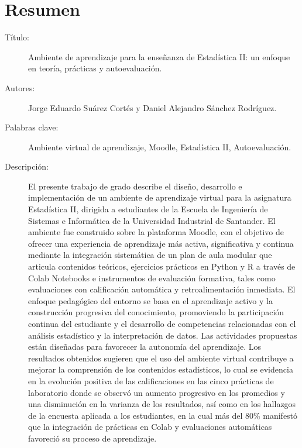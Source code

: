 \documentclass[letter,oneside,12pt,spanish]{report}
\begin{document}
\newpage

\newpage

\chapter*{Resumen}

\footnotesize{
\begin{description}
  \item[Título:] Ambiente de aprendizaje para la enseñanza de Estadística II: un enfoque en teoría, prácticas y autoevaluación.
  \item[Autores:] Jorge Eduardo Suárez Cortés y Daniel Alejandro Sánchez Rodríguez.
  \item[Palabras clave:] Ambiente virtual de aprendizaje, Moodle, Estadística II, Autoevaluación.
  \item[Descripción:] {
    \begin{spacing}{1.7}
    El presente trabajo de grado describe el diseño, desarrollo e implementación de un ambiente de aprendizaje virtual para la asignatura Estadística II, dirigida a estudiantes de la Escuela de Ingeniería de Sistemas e Informática de la Universidad Industrial de Santander. El ambiente fue construido sobre la plataforma Moodle, con el objetivo de ofrecer una experiencia de aprendizaje más activa, significativa y continua mediante la integración sistemática de un plan de aula modular que articula contenidos teóricos, ejercicios prácticos en Python y R a través de Colab Notebooks e instrumentos de evaluación formativa, tales como evaluaciones con calificación automática y retroalimentación inmediata.  
    El enfoque pedagógico del entorno se basa en el aprendizaje activo y la construcción progresiva del conocimiento, promoviendo la participación continua del estudiante y el desarrollo de competencias relacionadas con el análisis estadístico y la interpretación de datos. Las actividades propuestas están diseñadas para favorecer la autonomía del aprendizaje. Los resultados obtenidos sugieren que el uso del ambiente virtual contribuye a mejorar la comprensión de los contenidos estadísticos, lo cual se evidencia en la evolución positiva de las calificaciones en las cinco prácticas de laboratorio donde se observó un aumento progresivo en los promedios y una disminución en la varianza de los resultados, así como en los hallazgos de la encuesta aplicada a los estudiantes, en la cual más del 80\% manifestó que la integración de prácticas en Colab y evaluaciones automáticas favoreció su proceso de aprendizaje.  

\end{spacing}}
\end{description}}
\end{document}
